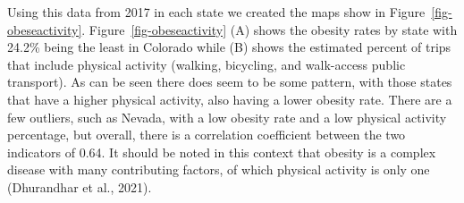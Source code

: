 \documentclass[
  letterpaper,
  authoryear,
  review,
  3p]{elsarticle}
\begin{document}
Using this data from 2017 in each state we created the maps show in
Figure~\ref{fig-obeseactivity}. Figure~\ref{fig-obeseactivity} (A) shows
the obesity rates by state with 24.2\% being the least in Colorado while
(B) shows the estimated percent of trips that include physical activity
(walking, bicycling, and walk-access public transport). As can be seen
there does seem to be some pattern, with those states that have a higher
physical activity, also having a lower obesity rate. There are a few
outliers, such as Nevada, with a low obesity rate and a low physical
activity percentage, but overall, there is a correlation coefficient
between the two indicators of 0.64. It should be noted in this context
that obesity is a complex disease with many contributing factors, of
which physical activity is only one (Dhurandhar et al., 2021).
\end{document}
